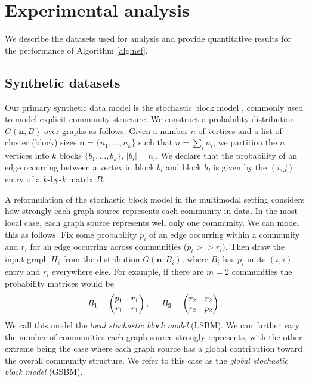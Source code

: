 \documentclass{IEEEtran}
\begin{document}
\section{Experimental analysis}
\label{sec:experiments}
We describe the datasets used for analysis and provide quantitative results for
the performance of Algorithm \ref{alg:nef}. 

\subsection{Synthetic datasets}
\label{sec:synthetic-model}

Our primary synthetic data model is the stochastic block model \cite{Wang87},
commonly used to model explicit community structure.  We construct a
probability distribution $G(\mathbf{n},B)$ over graphs as follows. Given a
number $n$ of vertices and a list of cluster (block) sizes $\mathbf{n}=\{n_1,
\dots, n_k\}$ such that $n =\sum_i n_i$, we partition the $n$ vertices into $k$
blocks $\{b_1, \dots, b_k\}$, $|b_i|=n_i$.  We declare that the probability of
an edge occurring between a vertex in block $b_i$ and block $b_j$ is given by
the $(i,j)$ entry of a $k$-by-$k$ matrix $B$. 

A reformulation of the stochastic block model in the multimodal setting
considers how strongly each graph source represents each community in data. In
the most local case, each graph source represents well only one community. We
can model this as follows. Fix some probability $p_i$ of an edge occurring within
a community and $r_i$ for an edge occurring across communities ($p_i>>r_i$). Then
draw the input graph $H_i$ from the distribution $G(\mathbf{n}, B_i)$, where
$B_i$ has $p_i$ in its $(i,i)$ entry and $r_i$ everywhere else. For example, if
there are $m=2$ communities the probability matrices would be
\[
B_1=\begin{pmatrix}
p_1 & r_1 \\
r_1 & r_1
\end{pmatrix},
\hspace{0.5cm}
B_2=\begin{pmatrix}
r_2 & r_2 \\
r_2 & p_2
\end{pmatrix}
.\]
We call this model the \emph{local stochastic block model} (LSBM).  We can
further vary the number of communities each graph source strongly represents,
with the other extreme being the case where each graph source has a global
contribution toward the overall community structure. We refer to this case as
the \emph{global stochastic block model} (GSBM).
\end{document}
